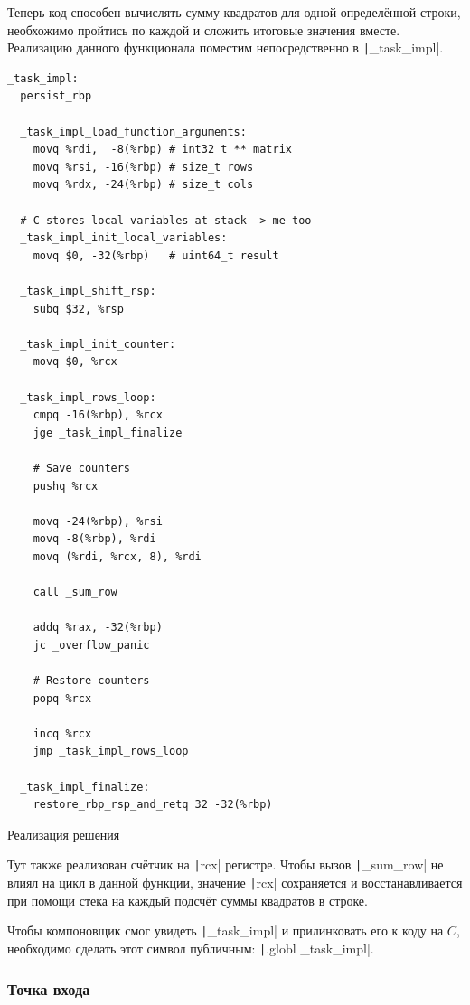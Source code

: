 \documentclass[a4paper]{article}
\begin{document}
  Теперь код способен вычислять сумму квадратов для одной определённой строки,
  необхожимо пройтись по каждой и сложить итоговые значения вместе. Реализацию
  данного функционала поместим непосредственно в \texttt|_task_impl|.

  \begin{listing}[H]
    \begin{verbatim}
_task_impl:
  persist_rbp 
 
  _task_impl_load_function_arguments:
    movq %rdi,  -8(%rbp) # int32_t ** matrix
    movq %rsi, -16(%rbp) # size_t rows
    movq %rdx, -24(%rbp) # size_t cols

  # C stores local variables at stack -> me too
  _task_impl_init_local_variables:
    movq $0, -32(%rbp)   # uint64_t result

  _task_impl_shift_rsp:
    subq $32, %rsp

  _task_impl_init_counter:
    movq $0, %rcx

  _task_impl_rows_loop:
    cmpq -16(%rbp), %rcx
    jge _task_impl_finalize
 
    # Save counters
    pushq %rcx

    movq -24(%rbp), %rsi
    movq -8(%rbp), %rdi
    movq (%rdi, %rcx, 8), %rdi

    call _sum_row    
    
    addq %rax, -32(%rbp)
    jc _overflow_panic

    # Restore counters
    popq %rcx

    incq %rcx
    jmp _task_impl_rows_loop

  _task_impl_finalize:  
    restore_rbp_rsp_and_retq 32 -32(%rbp)
    \end{verbatim}
    \caption{Реализация решения}
  \end{listing}

  Тут также реализован счётчик на \texttt|rcx| регистре.
  Чтобы вызов \texttt|_sum_row| не влиял на цикл в данной функции,
  значение \texttt|rcx| сохраняется и восстанавливается при помощи стека
  на каждый подсчёт суммы квадратов в строке.

  Чтобы компоновщик смог увидеть \texttt|_task_impl| и прилинковать
  его к коду на $C$, необходимо сделать этот символ публичным: \texttt|.globl _task_impl|.

  \subsubsection{Точка входа}
\end{document}

